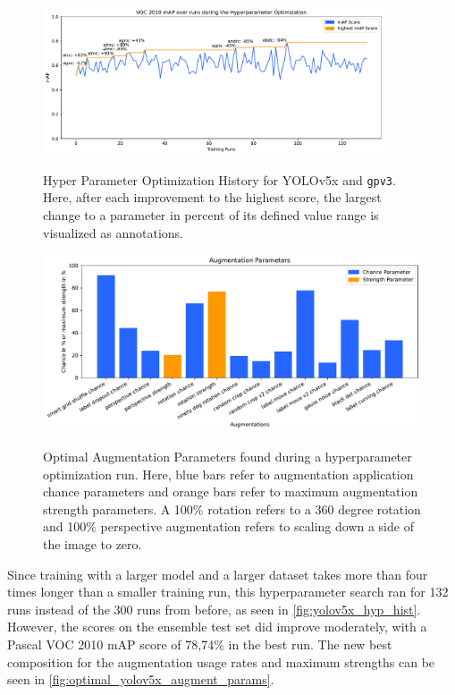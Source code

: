 \documentclass[10pt]{book}
\newcommand{\figureref}[1]{\autoref{#1}}
\begin{document}
\begin{figure}
  \caption{Hyper Parameter Optimization History for \ac{YOLO}v5x and \texttt{gpv3}. Here, after each improvement to the highest score, the largest change to a parameter in percent of its defined value range is visualized as annotations.}
  \includegraphics[width=0.9\textwidth]{image/hyp-param-search-yolov5x_gpv3_hyp_test-history}
  \label{fig:yolov5x_hyp_hist}
\end{figure}

\begin{figure}
  \caption{Optimal Augmentation Parameters found during a hyperparameter optimization run. Here, blue bars
  refer to augmentation application chance parameters and orange bars refer to maximum augmentation strength
  parameters. A 100\% rotation refers to a 360 degree rotation and 100\% perspective augmentation refers to scaling
  down a side of the image to zero.}
  \includegraphics[width=\textwidth]{plot/best_yolov5x_hyp_run_params}
  \label{fig:optimal_yolov5x_augment_params} 
\end{figure}

Since training with a larger model and a larger dataset takes more than four times longer than a smaller training run, this hyperparameter search ran for 132 runs instead of the 300 runs from before, as seen in \figureref{fig:yolov5x_hyp_hist}. However, the scores on the ensemble test set did improve moderately, with a Pascal VOC 2010 \ac{mAP} score of 78,74\% in the best run. The new best composition for the augmentation usage rates and maximum strengths can be seen in \figureref{fig:optimal_yolov5x_augment_params}.
\end{document}
